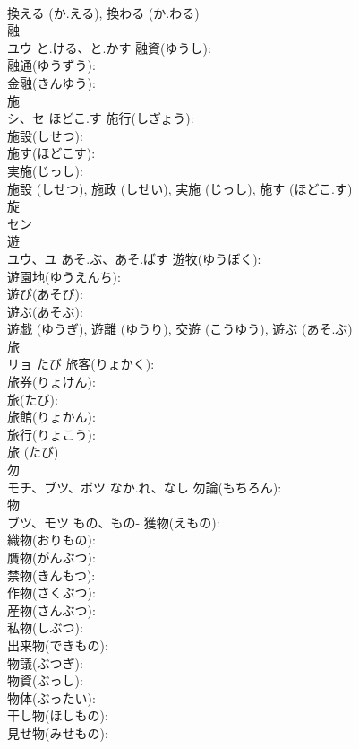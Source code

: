 \documentclass[8pt]{extreport}
\begin{document}
\begin{CJK}{UTF8}{min}
\\	換える (か.える), 換わる (か.わる)
\\	融			
\\	ユウ	と.ける、と.かす	融資(ゆうし): 
\\	融通(ゆうずう): 
\\	金融(きんゆう): 
\\	施			
\\	シ、セ	ほどこ.す	施行(しぎょう): 
\\	施設(しせつ): 
\\	施す(ほどこす): 
\\	実施(じっし): 
\\	施設 (しせつ), 施政 (しせい), 実施 (じっし), 施す (ほどこ.す)
\\	旋			
\\	セン			
\\	遊			
\\	ユウ、ユ	あそ.ぶ、あそ.ばす	遊牧(ゆうぼく): 
\\	遊園地(ゆうえんち): 
\\	遊び(あそび): 
\\	遊ぶ(あそぶ): 
\\	遊戯 (ゆうぎ), 遊離 (ゆうり), 交遊 (こうゆう), 遊ぶ (あそ.ぶ)
\\	旅			
\\	リョ	たび	旅客(りょかく): 
\\	旅券(りょけん): 
\\	旅(たび): 
\\	旅館(りょかん): 
\\	旅行(りょこう): 
\\	旅 (たび)
\\	勿			
\\	モチ、ブツ、ボツ	なか.れ、なし	勿論(もちろん): 
\\	物			
\\	ブツ、モツ	もの、もの-	獲物(えもの): 
\\	織物(おりもの): 
\\	贋物(がんぶつ): 
\\	禁物(きんもつ): 
\\	作物(さくぶつ): 
\\	産物(さんぶつ): 
\\	私物(しぶつ): 
\\	出来物(できもの): 
\\	物議(ぶつぎ): 
\\	物資(ぶっし): 
\\	物体(ぶったい): 
\\	干し物(ほしもの): 
\\	見せ物(みせもの): 

\end{CJK}
\end{document}
